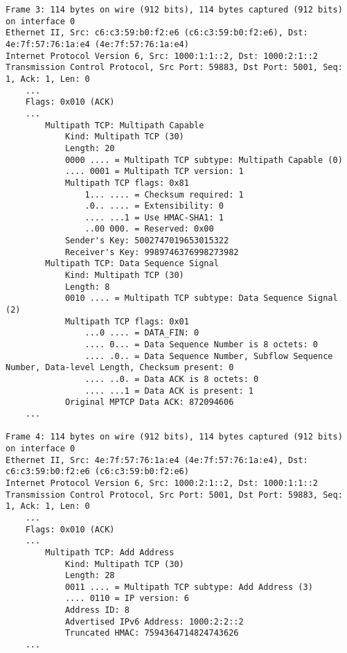 \begin{verbatim}
Frame 3: 114 bytes on wire (912 bits), 114 bytes captured (912 bits) on interface 0
Ethernet II, Src: c6:c3:59:b0:f2:e6 (c6:c3:59:b0:f2:e6), Dst: 4e:7f:57:76:1a:e4 (4e:7f:57:76:1a:e4)
Internet Protocol Version 6, Src: 1000:1:1::2, Dst: 1000:2:1::2
Transmission Control Protocol, Src Port: 59883, Dst Port: 5001, Seq: 1, Ack: 1, Len: 0
    ...
    Flags: 0x010 (ACK)
    ...
        Multipath TCP: Multipath Capable
            Kind: Multipath TCP (30)
            Length: 20
            0000 .... = Multipath TCP subtype: Multipath Capable (0)
            .... 0001 = Multipath TCP version: 1
            Multipath TCP flags: 0x81
                1... .... = Checksum required: 1
                .0.. .... = Extensibility: 0
                .... ...1 = Use HMAC-SHA1: 1
                ..00 000. = Reserved: 0x00
            Sender's Key: 5002747019653015322
            Receiver's Key: 9989746376998273982
        Multipath TCP: Data Sequence Signal
            Kind: Multipath TCP (30)
            Length: 8
            0010 .... = Multipath TCP subtype: Data Sequence Signal (2)
            Multipath TCP flags: 0x01
                ...0 .... = DATA_FIN: 0
                .... 0... = Data Sequence Number is 8 octets: 0
                .... .0.. = Data Sequence Number, Subflow Sequence Number, Data-level Length, Checksum present: 0
                .... ..0. = Data ACK is 8 octets: 0
                .... ...1 = Data ACK is present: 1
            Original MPTCP Data ACK: 872094606
    ...

Frame 4: 114 bytes on wire (912 bits), 114 bytes captured (912 bits) on interface 0
Ethernet II, Src: 4e:7f:57:76:1a:e4 (4e:7f:57:76:1a:e4), Dst: c6:c3:59:b0:f2:e6 (c6:c3:59:b0:f2:e6)
Internet Protocol Version 6, Src: 1000:2:1::2, Dst: 1000:1:1::2
Transmission Control Protocol, Src Port: 5001, Dst Port: 59883, Seq: 1, Ack: 1, Len: 0
    ...
    Flags: 0x010 (ACK)
    ...
        Multipath TCP: Add Address
            Kind: Multipath TCP (30)
            Length: 28
            0011 .... = Multipath TCP subtype: Add Address (3)
            .... 0110 = IP version: 6
            Address ID: 8
            Advertised IPv6 Address: 1000:2:2::2
            Truncated HMAC: 7594364714824743626
    ...


\end{verbatim}
